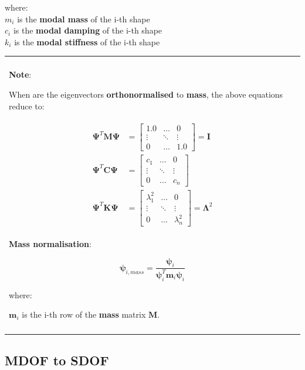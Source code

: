 \documentclass[10pt,b5paper,titlepage]{book}
\newcommand{\m}{\mathbf}
\newcommand{\M}{\pmb}
\newenvironment{bbox}[1][0.96]
{
    \begin{center}
        \begin{tabular}{|p{#1\textwidth}|}
            \hline\\
}
{
            \\\\\hline
        \end{tabular}
    \end{center}
}
\newenvironment{eqarray}
{
    \begin{eqnarray}
        \begin{aligned}
}
{
        \end{aligned}
    \end{eqnarray}
}
\begin{document}
where: \\
$ m_i $ is the \textbf{modal mass} of the i-th shape\\
$ c_i $ is the \textbf{modal damping} of the i-th shape\\
$ k_i $ is the \textbf{modal stiffness} of the i-th shape

\begin{bbox}[0.96]
    \textbf{Note}:

    When are the eigenvectors \textbf{orthonormalised} to \textbf{mass}, the above
    equations reduce to:

    \begin{eqarray}
        \M{\Psi}^T \m{M} \M{\Psi}
        &= \begin{bmatrix}
            1.0 & \dots & 0 \\
            \vdots & \ddots & \vdots \\
            0 & \dots & 1.0
        \end{bmatrix} = \m{I} \\
        \M{\Psi}^T \m{C} \M{\Psi}
        &= \begin{bmatrix}
            c_1 & \dots & 0 \\
            \vdots & \ddots & \vdots \\
            0 & \dots & c_n
        \end{bmatrix} \\
        \M{\Psi}^T \m{K} \M{\Psi}
        &= \begin{bmatrix}
            \lambda_1^2 & \dots & 0 \\
            \vdots & \ddots & \vdots \\
            0 & \dots & \lambda_n^2
        \end{bmatrix} = \M{\Lambda}^2
    \end{eqarray}

    \textbf{Mass normalisation}:

    \begin{equation}
        \M{\psi}_{i,mass} = \frac{\M{\psi}_i}{\M{\psi}_i^T \m{m}_i \M{\psi}_i}
    \end{equation}

    where:

    $ \m{m}_i $ is the i-th row of the \textbf{mass} matrix $ \m{M} $.

\end{bbox}


\subsection{MDOF to SDOF}
\end{document}
